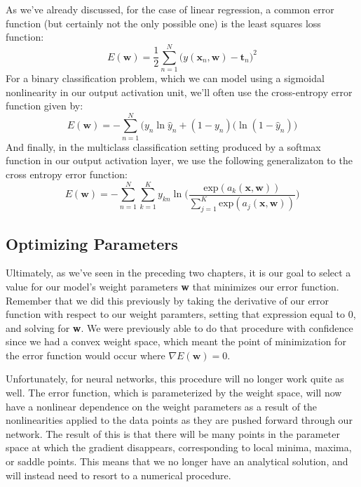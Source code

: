As we've already discussed, for the case of linear regression, a common error function (but certainly not the only possible one) is the least squares loss function:
\begin{equation} \label{least-squares-loss-function}
	E(\textbf{w}) = \frac{1}{2} \sum_{n=1}^{N} \bigg(y(\textbf{x}_{n}, \textbf{w}) - \textbf{t}_{n}\bigg)^{2}
\end{equation}
For a binary classification problem, which we can model using a sigmoidal nonlinearity in our output activation unit, we'll often use the cross-entropy error function given by:
\begin{equation} \label{cross-entropy-loss-function}
	E(\textbf{w}) = - \sum_{n=1}^{N} \bigg(y_{n}\ln{\hat{y}_{n}} + (1 - y_{n})(\ln{(1 - \hat{y}_{n})}\bigg)
\end{equation}
And finally, in the multiclass classification setting produced by a softmax function in our output activation layer, we use the following generalizaton to the cross entropy error function:
\begin{equation} \label{multiclass-cross-entropy-loss-function}
	E(\textbf{w}) = - \sum_{n=1}^{N} \sum_{k=1}^{K} y_{kn} \ln{\bigg(\frac{\text{exp}(a_{k}(\textbf{x}, \textbf{w}))}{\sum_{j=1}^{K}\text{exp}(a_{j}(\textbf{x}, \textbf{w}))}\bigg)}
\end{equation}

\subsection{Optimizing Parameters}
Ultimately, as we've seen in the preceding two chapters, it is our goal to select a value for our model's weight parameters \textbf{w} that minimizes our error function. Remember that we did this previously by taking the derivative of our error function with respect to our weight paramters, setting that expression equal to 0, and solving for \textbf{w}. We were previously able to do that procedure with confidence since we had a convex weight space, which meant the point of minimization for the error function would occur where $\nabla E(\textbf{w}) = 0$.

Unfortunately, for neural networks, this procedure will no longer work quite as well. The error function, which is parameterized by the weight space, will now have a nonlinear dependence on the weight parameters as a result of the nonlinearities applied to the data points as they are pushed forward through our network. The result of this is that there will be many points in the parameter space at which the gradient disappears, corresponding to local minima, maxima, or saddle points. This means that we no longer have an analytical solution, and will instead need to resort to a numerical procedure.

